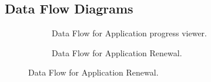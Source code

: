 \documentclass[12pt]{article}
\begin{document}
\subsection{Data Flow Diagrams}
\begin{figure}


\begin{subfigure}[p]{0.47\textwidth}
\centering	
{}
\caption{Data Flow for Application progress viewer.}
\end{subfigure}

\begin{subfigure}[p]{0.47\textwidth}
\centering	
{}
\caption{Data Flow for Application Renewal.}
\end{subfigure}


\end{figure}
\end{document}
